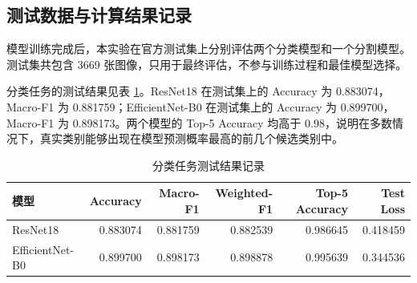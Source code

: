 \documentclass[UTF8,a4paper,12pt]{ctexart}
\begin{document}
\begin{table}[H]
\centering
\caption{训练日志与最佳权重文件}
\label{tab:training-record-files}
\end{table}

\subsection{测试数据与计算结果记录}

模型训练完成后，本实验在官方测试集上分别评估两个分类模型和一个分割模型。测试集共包含 3669 张图像，只用于最终评估，不参与训练过程和最佳模型选择。

分类任务的测试结果见表 \ref{tab:cls-test-record}。ResNet18 在测试集上的 Accuracy 为 0.883074，Macro-F1 为 0.881759；EfficientNet-B0 在测试集上的 Accuracy 为 0.899700，Macro-F1 为 0.898173。两个模型的 Top-5 Accuracy 均高于 0.98，说明在多数情况下，真实类别能够出现在模型预测概率最高的前几个候选类别中。

\begin{table}[H]
\centering
\caption{分类任务测试结果记录}
\label{tab:cls-test-record}
\begin{tabular}{lrrrrr}
\toprule
模型 & Accuracy & Macro-F1 & Weighted-F1 & Top-5 Accuracy & Test Loss \\
\midrule
ResNet18 & 0.883074 & 0.881759 & 0.882539 & 0.986645 & 0.418459 \\
EfficientNet-B0 & 0.899700 & 0.898173 & 0.898878 & 0.995639 & 0.344536 \\
\bottomrule
\end{tabular}
\end{table}
\end{document}
